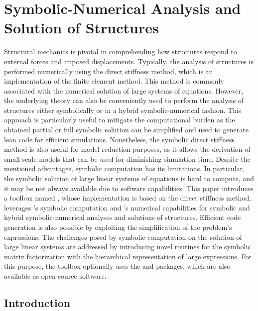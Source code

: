 
\chapter{Symbolic-Numerical Analysis and Solution of Structures}
\label{chap7:chap:symbolic_structural_analysis}

Structural mechanics is pivotal in comprehending how structures respond to external forces and imposed displacements. Typically, the analysis of structures is performed numerically using the direct stiffness method, which is an implementation of the finite element method. This method is commonly associated with the numerical solution of large systems of equations. However, the underlying theory can also be conveniently used to perform the analysis of structures either symbolically or in a hybrid symbolic-numerical fashion. This approach is particularly useful to mitigate the computational burden as the obtained partial or full symbolic solution can be simplified and used to generate lean code for efficient simulations. Nonetheless, the symbolic direct stiffness method is also useful for model reduction purposes, as it allows the derivation of small-scale models that can be used for diminishing simulation time. Despite the mentioned advantages, symbolic computation has its limitations. In particular, the symbolic solution of large linear systems of equations is hard to compute, and it may be not always available due to software capabilities. This paper introduces a toolbox named \TrussMe{}, whose implementation is based on the direct stiffness method. \TrussMe{} leverages \Maple{}'s symbolic computation and \Matlab{}'s numerical capabilities for symbolic and hybrid symbolic-numerical analyses and solutions of structures. Efficient code generation is also possible by exploiting the simplification of the problem's expressions. The challenges posed by symbolic computation on the solution of large linear systems are addressed by introducing novel routines for the symbolic matrix factorization with the hierarchical representation of large expressions. For this purpose, the \TrussMe{} toolbox optionally uses the \LEM{} and \LAST{} \Maple{} packages, which are also available as open-source software.


\section{Introduction}
\label{chap7:sec:introduction}

